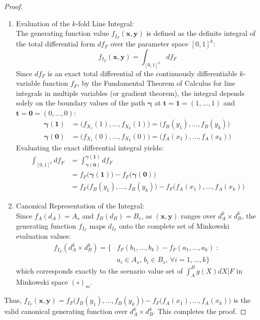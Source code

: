 \documentclass[a4paper,12pt,twoside]{memoir}
\begin{document}
\begin{proof}
\begin{enumerate}[leftmargin=*]
			\item Evaluation of the $k$-fold Line Integral: \\
			The generating function value $f_{I_F}(\mathbf{x}, \mathbf{y})$ is defined as the definite integral of the total differential form $df_F$ over the parameter space $[0, 1]^k$:
			\[
			f_{I_F}(\mathbf{x}, \mathbf{y}) = \int_{[0, 1]^k} d f_F
			\]
			Since $df_F$ is an exact total differential of the continuously differentiable $k$-variable function $f_F$, by the Fundamental Theorem of Calculus for line integrals in multiple variables (or gradient theorem), the integral depends solely on the boundary values of the path $\boldsymbol{\gamma}$ at $\mathbf{t} = \mathbf{1} = (1, \dots, 1)$ and $\mathbf{t} = \mathbf{0} = (0, \dots, 0)$:
			\begin{align*}
				\boldsymbol{\gamma}(\mathbf{1}) & = \big(f_{X_1}(1), \dots, f_{X_k}(1)\big) = \big(f_B(y_1), \dots, f_B(y_k)\big)  \\
				\boldsymbol{\gamma}(\mathbf{0}) & = \big(f_{X_1}(0), \dots, f_{X_k}(0)\big) = \big(f_A(x_1), \dots, f_A(x_k)\big)
			\end{align*}
			Evaluating the exact differential integral yields:
			\begin{align*}
				\int_{[0, 1]^k} d f_F & = \int_{\boldsymbol{\gamma}(\mathbf{0})}^{\boldsymbol{\gamma}(\mathbf{1})} d f_F              \\
				& = f_F\big(\boldsymbol{\gamma}(\mathbf{1})\big) - f_F\big(\boldsymbol{\gamma}(\mathbf{0})\big) \\
				& = f_F\big(f_B(y_1), \dots, f_B(y_k)\big) - f_F\big(f_A(x_1), \dots, f_A(x_k)\big)
			\end{align*}
			
			\item Canonical Representation of the Integral: \\
			Since $f_A(d_A) = A_s$ and $f_B(d_B) = B_s$, as $(\mathbf{x}, \mathbf{y})$ ranges over $d_A^k \times d_B^k$, the generating function $f_{I_F}$ maps $d_{I_F}$ onto the complete set of Minkowski evaluation values:
			\begin{align*}
				f_{I_F}(d_A^k \times d_B^k) = \Big\{ &f_F(b_1, \dots, b_k) - f_F(a_1, \dots, a_k) \;:\; \\
				&a_i \in A_s, \, b_i \in B_s, \, \forall i=1,\dots,k \Big\}
			\end{align*}
			which corresponds exactly to the scenario value set of $\int_A^B g(X)dX \Big| F$ in Minkowski space $(\circ)_m$.
		\end{enumerate}
		
		Thus, $f_{I_F}(\mathbf{x}, \mathbf{y}) = f_F\big(f_B(y_1), \dots, f_B(y_k)\big) - f_F\big(f_A(x_1), \dots, f_A(x_k)\big)$ is the valid canonical generating function over $d_A^k \times d_B^k$. This completes the proof.
	\end{proof}
\end{document}

